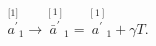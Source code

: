 \begin{equation}
\stackrel{\lbrack 1]}{a^{\prime }}_{1}\rightarrow \stackrel{[1]}{\bar{a}%
^{\prime }}_{1}=\stackrel{[1]}{a^{\prime }}_{1}+\gamma T.  \label{bf78b}
\end{equation}

